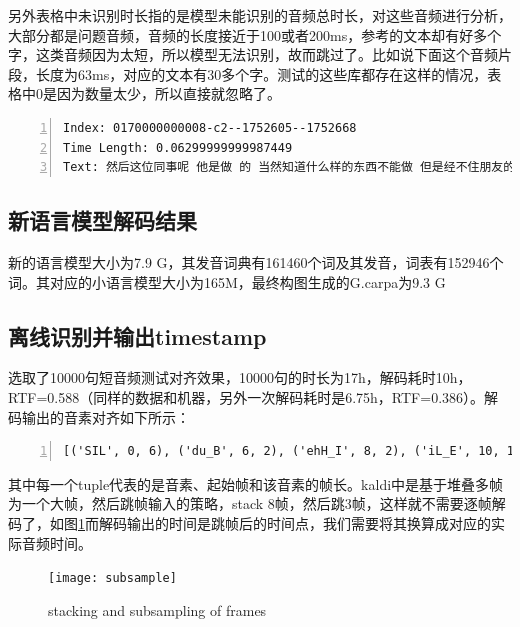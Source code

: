 另外表格中未识别时长指的是模型未能识别的音频总时长，对这些音频进行分析，大部分都是问题音频，音频的长度接近于100或者200ms，参考的文本却有好多个字，这类音频因为太短，所以模型无法识别，故而跳过了。比如说下面这个音频片段，长度为63ms，对应的文本有30多个字。测试的这些库都存在这样的情况，表格中0是因为数量太少，所以直接就忽略了。
\begin{lstlisting}[language=shell, numbers=left, 
         numberstyle=\tiny,keywordstyle=\color{blue!70},
         commentstyle=\color{red!50!green!50!blue!50},frame=shadowbox,
         rulesepcolor=\color{red!20!green!20!blue!20},basicstyle=\ttfamily]
Index: 0170000000008-c2--1752605--1752668  
Time Length: 0.06299999999987449 
Text: 然后这位同事呢 他是做 的 当然知道什么样的东西不能做 但是经不住朋友的要求
\end{lstlisting}

\subsection{新语言模型解码结果}
新的语言模型大小为7.9 G，其发音词典有161460个词及其发音，词表有152946个词。其对应的小语言模型大小为165M，最终构图生成的G.carpa为9.3 G

\subsection{离线识别并输出timestamp}
选取了10000句短音频测试对齐效果，10000句的时长为17h，解码耗时10h，RTF=0.588（同样的数据和机器，另外一次解码耗时是6.75h，RTF=0.386）。解码输出的音素对齐如下所示：
\begin{lstlisting}[language=shell, numbers=left, 
         numberstyle=\tiny,keywordstyle=\color{blue!70},
         commentstyle=\color{red!50!green!50!blue!50},frame=shadowbox,
         rulesepcolor=\color{red!20!green!20!blue!20},basicstyle=\ttfamily]
[('SIL', 0, 6), ('du_B', 6, 2), ('ehH_I', 8, 2), ('iL_E', 10, 1), ('wu_B', 11, 1), ('oL_I', 12, 1), ('oL_I', 13, 1), ('m_I', 14, 1), ('elM_I', 15, 3), ('nnM_E', 18, 1), ('m_B', 19, 1), ('ehL_I', 20, 2), ('iH_I', 22, 2), ('yi_I', 24, 1), ('oL_I', 25, 1), ('uL_E', 26, 2), ('n_B', 28, 1), ('aH_I', 29, 2), ('aL_I', 31, 1), ('g_I', 32, 4), ('elM_I', 36, 1), ('elM_E', 37, 1), ('SIL', 38, 2), ('ji_B', 40, 2), ('iH_I', 42, 2), ('iH_I', 44, 1), ('ji_I', 45, 3), ('iH_I', 48, 2), ('nnH_E', 50, 4), ('SIL', 54, 9)]
\end{lstlisting}

其中每一个tuple代表的是音素、起始帧和该音素的帧长。kaldi中是基于堆叠多帧为一个大帧，然后跳帧输入的策略，stack 8帧，然后跳3帧，这样就不需要逐帧解码了，如图\ref{fig:subsample}而解码输出的时间是跳帧后的时间点，我们需要将其换算成对应的实际音频时间。
\begin{figure}[!ht]
	\centering
	\texttt{[image: subsample]}
	\caption{stacking and subsampling of frames}
\label{fig:subsample}
\end{figure}

